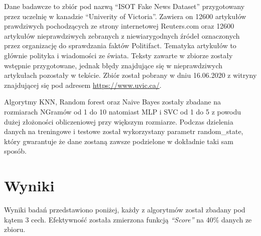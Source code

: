 Dane badawcze to zbiór pod nazwą ``ISOT Fake News Dataset'' przygotowany przez uczelnię w 
kanadzie ``Univerity of Victoria''. Zawiera on 12600 artykułów prawdziwych pochodzących ze strony
internetowej Reuters.com oraz 12600 artykułów nieprawdziwych zebranych z niewiarygodnych źródeł
oznaczonych przez organizację do sprawdzania faktów Politifact. Tematyka artykułów to głównie polityka i wiadomości 
ze świata.  Teksty zawarte w zbiorze zostały wstępnie przygotowane, jednak błędy znajdujące się w nieprawdziwych 
artykułach pozostały w tekście. Zbiór został pobrany w dniu 16.06.2020 z witryny znajdującej się pod adresem \url{https://www.uvic.ca/}.~\cite{ISOT}

Algorytmy KNN, Random forest oraz Naive Bayes zostały zbadane na rozmiarach NGramów od 1 do 10 natomiast
MLP i SVC od 1 do 5 z powodu dużej złożoności obliczeniowej przy większym rozmiarze. Podczas
dzielenia danych na treningowe i testowe został wykorzystany parametr random\_state, który gwarantuje
że dane zostaną zawsze podzielone w dokładnie taki sam sposób.
\section{Wyniki}
Wyniki badań przedstawiono poniżej, każdy z algorytmów został zbadany pod 
kątem 3 cech. Efektywność została zmierzona funkcją \textit{``Score''} na 40\% danych ze zbioru.
\begin{table}[H]
    \centering
    \caption{Wyniki algorytmu KNN wektoryzacja metodą Bag of words}
\end{table}

